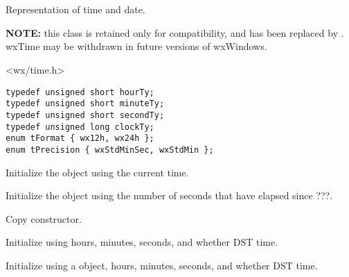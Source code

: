\section{}\label{wxtime}

Representation of time and date.

{\bf NOTE:} this class is retained only for compatibility,
and has been replaced by . wxTime
may be withdrawn in future versions of wxWindows.




<wx/time.h>


\begin{verbatim}
typedef unsigned short hourTy;
typedef unsigned short minuteTy;
typedef unsigned short secondTy;
typedef unsigned long clockTy;
enum tFormat { wx12h, wx24h };
enum tPrecision { wxStdMinSec, wxStdMin };
\end{verbatim}




\label{wxtimewxtime}


Initialize the object using the current time.


Initialize the object using the number of seconds that have elapsed since ???.


Copy constructor.


Initialize using hours, minutes, seconds, and whether DST time.


Initialize using a  object, hours, minutes, seconds, and whether DST time.

